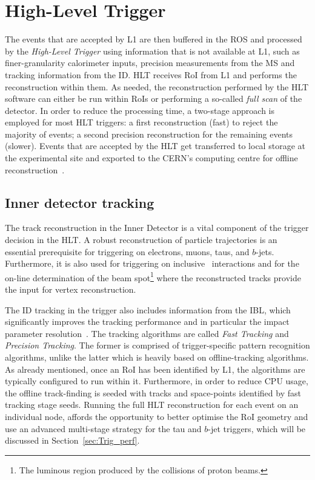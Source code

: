 		

			


	\section{High-Level Trigger}
	\label{sec:HLT}

		The events that are accepted by \ac{L1} are then buffered in the \ac{ROS} and processed by the \emph{High-Level Trigger} using information that is not available at \ac{L1}, such as finer-granularity calorimeter inputs, precision measurements from the \ac{MS} and tracking information from the \ac{ID}. \ac{HLT} receives \ac{RoI} from \ac{L1} and performs the reconstruction within them. As needed, the reconstruction performed by the \ac{HLT} software can either be run within \ac{RoI}s or performing a so-called \emph{full scan} of the detector. In order to reduce the processing time, a two-stage approach is employed for most \ac{HLT} triggers: a first reconstruction (fast) to reject the majority of events; a second precision reconstruction for the remaining events (slower). Events that are accepted by the \ac{HLT} get transferred to local storage at the experimental site and exported to the \ac{CERN}’s computing centre for offline reconstruction~\cite{ATLASTrigger2015}. 

		
		\subsection{Inner detector tracking}
		\label{sec:tracking}

			The track reconstruction in the Inner Detector is a vital component of the trigger decision in the \ac{HLT}. A robust reconstruction of particle trajectories is an essential prerequisite for triggering on electrons, muons, taus, and $b$-jets. Furthermore, it is also used for triggering on inclusive \pp\ interactions and for the on-line determination of the beam spot\footnote{The luminous region produced by the collisions of proton beams.} where the reconstructed tracks provide the input for vertex reconstruction.

			The ID tracking in the trigger also includes information from the IBL, which significantly improves the tracking performance and in particular the impact parameter resolution~\cite{IBLTDR}. The tracking algorithms are called \emph{Fast Tracking} and \emph{Precision Tracking}. The former is comprised of trigger-specific pattern recognition algorithms, unlike the latter which is heavily based on offline-tracking algorithms.
			As already mentioned, once an \ac{RoI} has been identified by \ac{L1}, the algorithms are typically configured to run within it. Furthermore, in order to reduce \ac{CPU} usage, the offline track-finding is seeded with tracks and space-points identified by fast tracking stage seeds. Running the full \ac{HLT} reconstruction for each event on an individual node, affords the opportunity to better optimise the \ac{RoI} geometry and use an advanced multi-stage strategy for the tau and $b$-jet triggers, which will be discussed in Section~\ref{sec:Trig_perf}. 

